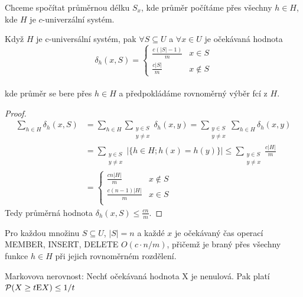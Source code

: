 Chceme spočítat průměrnou délku $S_x$, kde průměr počítáme přes
všechny $h \in H$, kde $H$ je $c$-univerzální systém.

\begin{theorem}
Když $H$ je c-universální systém, pak $\forall S \subseteq U$ a $\forall x \in
U$ je očekávaná hodnota \\
\[
\delta_h(x,S) = 
\begin{cases}
\frac{c(|S| - 1)}{m} & x \in S \\
\frac{c|S|}{m} & x \notin S
\end{cases}
\]
\\
kde průměr se bere přes $h \in H$ a předpokládáme rovnoměrný výběr fcí z
$H$.
\end{theorem}

\begin{proof}
\begin{equation*}
\begin{split}
\sum_{h \in H} \delta_h(x, S)
 & = \sum_{h \in H} \sum_{\substack{y \in S\\y \ne x}} \delta_h(x,y)
   = \sum_{\substack{y \in S\\y \ne x}} \sum_{h \in H} \delta_h(x,y)\\
 & = \sum_{\substack{y \in S\\y \ne x}} |\{ h \in H; h(x) = h(y) \}|
   \leq \sum_{\substack{y \in S\\y \ne x}} \frac{c|H|}m \\
 & = \begin{cases}
 \frac{cn|H|}m & x \notin S \\
 \frac{c(n-1)|H|}m & x \in S \\
 \end{cases}
\end{split}
\end{equation*}
Tedy  průměrná hodnota $\delta_h(x,S) \leq \frac{cn}m$.
\end{proof}

\begin{theorem}
\label{veta-ocek-pocet}
Pro každou množinu $S \subseteq U$, $|S| = n$ a každé $x$ je očekávaný
čas operací MEMBER, INSERT, DELETE $O(c \cdot n/m)$, přičemž je braný
přes všechny funkce $h \in H$ při jejich rovnoměrném rozdělení.
\end{theorem}

\begin{theorem}
Markovova nerovnost: Nechť očekávaná hodnota X je nenulová. Pak platí 
${\cal P}(X \geq t \mathrm{E}X) \leq 1/t$
\end{theorem}

